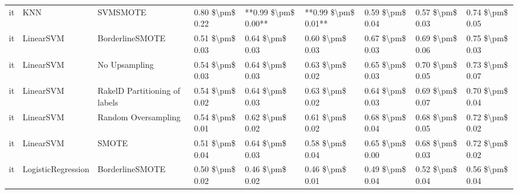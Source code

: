 \begin{tabular}{lllllllll}
      it &                             KNN &                      SVMSMOTE &     0.80 \$\textbackslash pm\$ 0.22 &       **0.99 \$\textbackslash pm\$ 0.00** &   **0.99 \$\textbackslash pm\$ 0.01** &        0.59 \$\textbackslash pm\$ 0.04 &                         0.57 \$\textbackslash pm\$ 0.03 &     0.74 \$\textbackslash pm\$ 0.05 \\
      it &                       LinearSVM &               BorderlineSMOTE &     0.51 \$\textbackslash pm\$ 0.03 &           0.64 \$\textbackslash pm\$ 0.03 &       0.60 \$\textbackslash pm\$ 0.03 &        0.67 \$\textbackslash pm\$ 0.03 &                         0.69 \$\textbackslash pm\$ 0.06 &     0.75 \$\textbackslash pm\$ 0.03 \\
      it &                       LinearSVM &                 No Upsampling &     0.54 \$\textbackslash pm\$ 0.03 &           0.64 \$\textbackslash pm\$ 0.03 &       0.63 \$\textbackslash pm\$ 0.02 &        0.65 \$\textbackslash pm\$ 0.03 &                         0.70 \$\textbackslash pm\$ 0.05 &     0.73 \$\textbackslash pm\$ 0.07 \\
      it &                       LinearSVM & RakelD Partitioning of labels &     0.54 \$\textbackslash pm\$ 0.02 &           0.64 \$\textbackslash pm\$ 0.03 &       0.63 \$\textbackslash pm\$ 0.02 &        0.64 \$\textbackslash pm\$ 0.03 &                         0.69 \$\textbackslash pm\$ 0.07 &     0.70 \$\textbackslash pm\$ 0.04 \\
      it &                       LinearSVM &           Random Oversampling &     0.54 \$\textbackslash pm\$ 0.01 &           0.62 \$\textbackslash pm\$ 0.02 &       0.61 \$\textbackslash pm\$ 0.02 &        0.68 \$\textbackslash pm\$ 0.04 &                         0.68 \$\textbackslash pm\$ 0.05 &     0.72 \$\textbackslash pm\$ 0.02 \\
      it &                       LinearSVM &                         SMOTE &     0.51 \$\textbackslash pm\$ 0.04 &           0.64 \$\textbackslash pm\$ 0.03 &       0.58 \$\textbackslash pm\$ 0.04 &        0.65 \$\textbackslash pm\$ 0.00 &                         0.68 \$\textbackslash pm\$ 0.03 &     0.72 \$\textbackslash pm\$ 0.02 \\
      it &              LogisticRegression &               BorderlineSMOTE &     0.50 \$\textbackslash pm\$ 0.02 &           0.46 \$\textbackslash pm\$ 0.02 &       0.46 \$\textbackslash pm\$ 0.01 &        0.49 \$\textbackslash pm\$ 0.04 &                         0.52 \$\textbackslash pm\$ 0.04 &     0.56 \$\textbackslash pm\$ 0.04 \\

\end{tabular}
